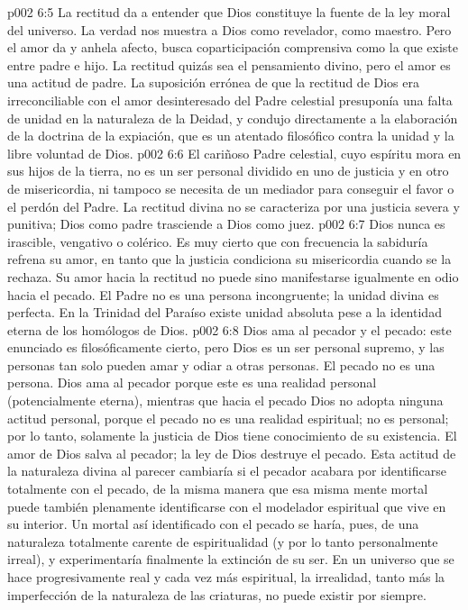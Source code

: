 \vs p002 6:5 \pc La rectitud da a entender que Dios constituye la fuente de la ley moral del universo. La verdad nos muestra a Dios como revelador, como maestro. Pero el amor da y anhela afecto, busca coparticipación comprensiva como la que existe entre padre e hijo. La rectitud quizás sea el pensamiento divino, pero el amor es una actitud de padre. La suposición errónea de que la rectitud de Dios era irreconciliable con el amor desinteresado del Padre celestial presuponía una falta de unidad en la naturaleza de la Deidad, y condujo directamente a la elaboración de la doctrina de la expiación, que es un atentado filosófico contra la unidad y la libre voluntad de Dios.
\vs p002 6:6 El cariñoso Padre celestial, cuyo espíritu mora en sus hijos de la tierra, no es un ser personal dividido en uno de justicia y en otro de misericordia, ni tampoco se necesita de un mediador para conseguir el favor o el perdón del Padre. La rectitud divina no se caracteriza por una justicia severa y punitiva; Dios como padre trasciende a Dios como juez.
\vs p002 6:7 \pc Dios nunca es irascible, vengativo o colérico. Es muy cierto que con frecuencia la sabiduría refrena su amor, en tanto que la justicia condiciona su misericordia cuando se la rechaza. Su amor hacia la rectitud no puede sino manifestarse igualmente en odio hacia el pecado. El Padre no es una persona incongruente; la unidad divina es perfecta. En la Trinidad del Paraíso existe unidad absoluta pese a la identidad eterna de los homólogos de Dios.
\vs p002 6:8 \pc Dios ama al pecador y  el pecado: este enunciado es filosóficamente cierto, pero Dios es un ser personal supremo, y las personas tan solo pueden amar y odiar a otras personas. El pecado no es una persona. Dios ama al pecador porque este es una realidad personal (potencialmente eterna), mientras que hacia el pecado Dios no adopta ninguna actitud personal, porque el pecado no es una realidad espiritual; no es personal; por lo tanto, solamente la justicia de Dios tiene conocimiento de su existencia. El amor de Dios salva al pecador; la ley de Dios destruye el pecado. Esta actitud de la naturaleza divina al parecer cambiaría si el pecador acabara por identificarse totalmente con el pecado, de la misma manera que esa misma mente mortal puede también plenamente identificarse con el modelador espiritual que vive en su interior. Un mortal así identificado con el pecado se haría, pues, de una naturaleza totalmente carente de espiritualidad (y por lo tanto personalmente irreal), y experimentaría finalmente la extinción de su ser. En un universo que se hace progresivamente real y cada vez más espiritual, la irrealidad, tanto más la imperfección de la naturaleza de las criaturas, no puede existir por siempre.
